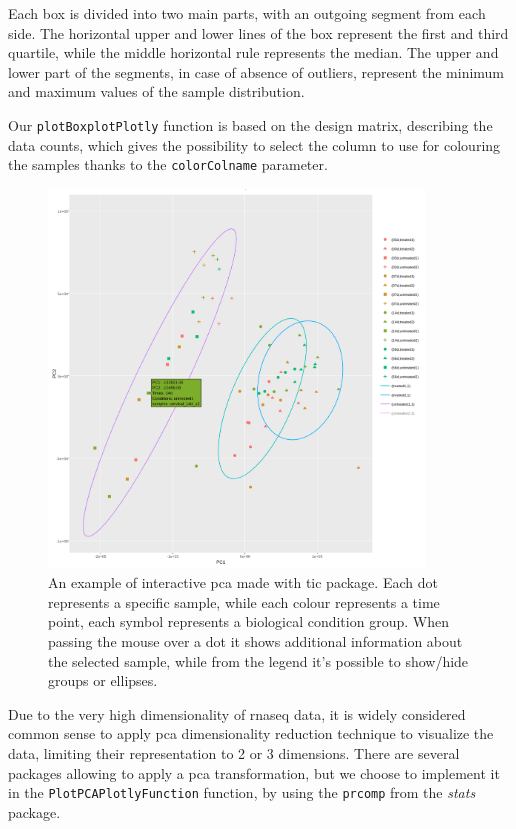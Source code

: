 Each box is divided into two main parts, with an outgoing segment from each side. 
The horizontal upper and lower lines of the box represent the first and third quartile, while the middle horizontal rule represents the median.
The upper and lower part of the segments, in case of absence of outliers, represent the minimum and maximum values of the sample distribution.

Our \lstinline!plotBoxplotPlotly! function is based on the design matrix, describing the data counts, which gives the possibility to select the column to use for colouring the samples thanks to the \lstinline!colorColname! parameter. 

\begin{figure}[H]
\centering
\includegraphics[width=10cm, keepaspectratio]{img/ticorser/pca_example.png}
\caption[\gls{tic} pca]{An example of interactive \gls{pca} made with \gls{tic} package. Each dot represents a specific sample, while each colour represents a time point, each symbol represents a biological condition group. When passing the mouse over a dot it shows additional information about the selected sample, while from the legend it's possible to show/hide groups or ellipses.}
\label{fig:ticorserpca}
\end{figure}

Due to the very high dimensionality of \gls{rnaseq} data, it is widely considered common sense to apply \gls{pca} dimensionality reduction technique to visualize the data, limiting their representation to 2 or 3 dimensions.
There are several packages allowing to apply a \gls{pca} transformation, but we choose to implement it in the \lstinline!PlotPCAPlotlyFunction! function, by using the \lstinline!prcomp! from the \textit{stats} package.

